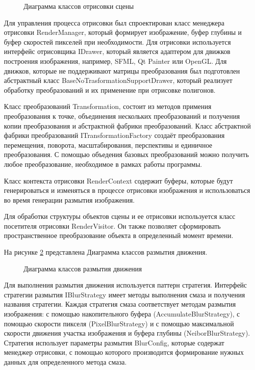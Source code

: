 \begin{figure}[h]
    \centering
    
    \caption{Диаграмма классов отрисовки сцены}
    \label{fig:uml_render}
\end{figure}

Для управления процесса отрисовки был спроектирован класс менеджера отрисовки RenderManager, который формирует изображение, буфер глубины и буфер  скоростей пикселей при необходимости. Для отрисовки используется интерфейс отрисовщика IDrawer, который является адаптером для движков построения изображения, например, SFML, Qt Painter или OpenGL. Для движков, которые не поддерживают матрицы преобразования был подготовлен абстрактный класс BaseNoTrasformationSupportDrawer, который реализует обработку преобразований и их применение при отрисовке полигонов.  

Класс преобразований Transformation, состоит из методов примения преобразования к точке, объединения нескольких преобразований и получения копии преобразования и абстрактной фабрики преобразований.
Класс абстрактной фабрики преобразований ITransformationFactory создаёт преобразования перемещения, поворота, масштабирования, перспективы и единичное преобразования. С помощью объедения базовых преобразований можно получить любое преобразование, необходимое в рамках работы программы.

Класс контекста отрисовки RenderContext содержит буферы, которые будут генерироваться и изменяться в процессе отрисовки изображения и использоваться во время генерации размытия изображения.

Для обработки структуры объектов сцены и ее отрисовки используется класс посетителя отрисовки RenderVisitor. Он также позволяет сформировать пространственное преобразование объекта в определенный момент времени.

На рисунке \ref{fig:uml_render} представлена Диаграмма классов размытия движения.  

\begin{figure}[h]
    \centering
    
    \caption{Диаграмма классов размытия движения}
    \label{fig:uml_render}
\end{figure}

Для выполнения размытия движения используется паттерн стратегия. Интерфейс стратегии размытия IBlurStrategy имеет методы выполнения смаза и получения названия стратегии. Каждая стратегия смаза соответствует методам размытия изображения: с помощью накопительного буфера (AccumulateBlurStrategy), с помощью скорости пикселя (PixelBlurStrategy) и с помощью максимальной скорости
движения участка изображения и буфера глубины (NeiborBlurStrategy). Стратегия использует параметры размытия BlurConfig, которые содержат менеджер отрисовки, с помощью которого производится формирование нужных данных для определенного метода смаза.

